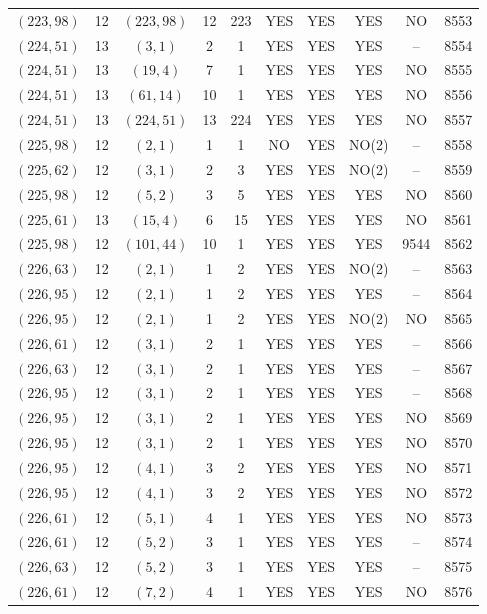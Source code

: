 \begin{longtable}{|c|c|c|c|c|c|c|c|c|c|}
$(223, 98)$ & 12 & $(223, 98)$ & 12 & 223 & YES & YES & YES & NO & 8553\\
$(224, 51)$ & 13 & $(3, 1)$ & 2 & 1 & YES & YES & YES & -- & 8554\\
$(224, 51)$ & 13 & $(19, 4)$ & 7 & 1 & YES & YES & YES & NO & 8555\\
$(224, 51)$ & 13 & $(61, 14)$ & 10 & 1 & YES & YES & YES & NO & 8556\\
$(224, 51)$ & 13 & $(224, 51)$ & 13 & 224 & YES & YES & YES & NO & 8557\\
$(225, 98)$ & 12 & $(2, 1)$ & 1 & 1 & NO & YES & NO(2) & -- & 8558\\
$(225, 62)$ & 12 & $(3, 1)$ & 2 & 3 & YES & YES & NO(2) & -- & 8559\\
$(225, 98)$ & 12 & $(5, 2)$ & 3 & 5 & YES & YES & YES & NO & 8560\\
$(225, 61)$ & 13 & $(15, 4)$ & 6 & 15 & YES & YES & YES & NO & 8561\\
$(225, 98)$ & 12 & $(101, 44)$ & 10 & 1 & YES & YES & YES & 9544 & 8562\\
$(226, 63)$ & 12 & $(2, 1)$ & 1 & 2 & YES & YES & NO(2) & -- & 8563\\
$(226, 95)$ & 12 & $(2, 1)$ & 1 & 2 & YES & YES & YES & -- & 8564\\
$(226, 95)$ & 12 & $(2, 1)$ & 1 & 2 & YES & YES & NO(2) & NO & 8565\\
$(226, 61)$ & 12 & $(3, 1)$ & 2 & 1 & YES & YES & YES & -- & 8566\\
$(226, 63)$ & 12 & $(3, 1)$ & 2 & 1 & YES & YES & YES & -- & 8567\\
$(226, 95)$ & 12 & $(3, 1)$ & 2 & 1 & YES & YES & YES & -- & 8568\\
$(226, 95)$ & 12 & $(3, 1)$ & 2 & 1 & YES & YES & YES & NO & 8569\\
$(226, 95)$ & 12 & $(3, 1)$ & 2 & 1 & YES & YES & YES & NO & 8570\\
$(226, 95)$ & 12 & $(4, 1)$ & 3 & 2 & YES & YES & YES & NO & 8571\\
$(226, 95)$ & 12 & $(4, 1)$ & 3 & 2 & YES & YES & YES & NO & 8572\\
$(226, 61)$ & 12 & $(5, 1)$ & 4 & 1 & YES & YES & YES & NO & 8573\\
$(226, 61)$ & 12 & $(5, 2)$ & 3 & 1 & YES & YES & YES & -- & 8574\\
$(226, 63)$ & 12 & $(5, 2)$ & 3 & 1 & YES & YES & YES & -- & 8575\\
$(226, 61)$ & 12 & $(7, 2)$ & 4 & 1 & YES & YES & YES & NO & 8576\\

\end{longtable}
